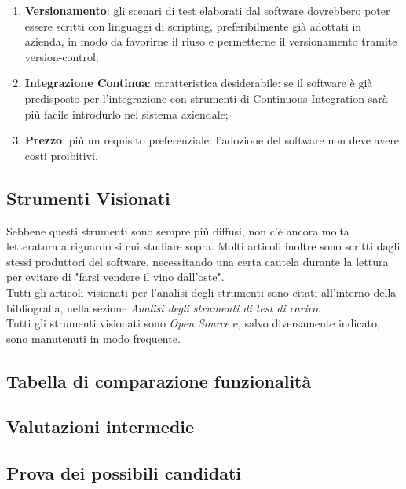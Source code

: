 \begin{enumerate}
	\item \textbf{Versionamento}: gli scenari di test elaborati dal software dovrebbero poter essere scritti con linguaggi di scripting, preferibilmente già adottati in azienda, in modo da favorirne il riuso e permetterne il versionamento tramite \gls{version-control};
	\item \textbf{Integrazione Continua}: caratteristica desiderabile: se il software è già predisposto per l'integrazione con strumenti di Continuous Integration sarà più facile introdurlo nel sistema aziendale;
	\item \textbf{Prezzo}: più un requisito preferenziale: l'adozione del software non deve avere costi proibitivi.
\end{enumerate}
\subsection{Strumenti Visionati}
Sebbene questi strumenti sono sempre più diffusi, non c'è ancora molta letteratura a riguardo si cui studiare sopra. Molti articoli inoltre sono scritti dagli stessi produttori del software, necessitando una certa cautela durante la lettura per evitare di "farsi vendere il vino dall'oste".\\
Tutti gli articoli visionati per l'analisi degli strumenti sono citati all'interno della bibliografia, nella sezione \textit{Analisi degli strumenti di test di carico}.\\
Tutti gli strumenti visionati sono \textit{Open Source} e, salvo diversamente indicato, sono manutenuti in modo frequente.


\subsection{Tabella di comparazione funzionalità}
\subsection{Valutazioni intermedie}
\subsection{Prova dei possibili candidati}
